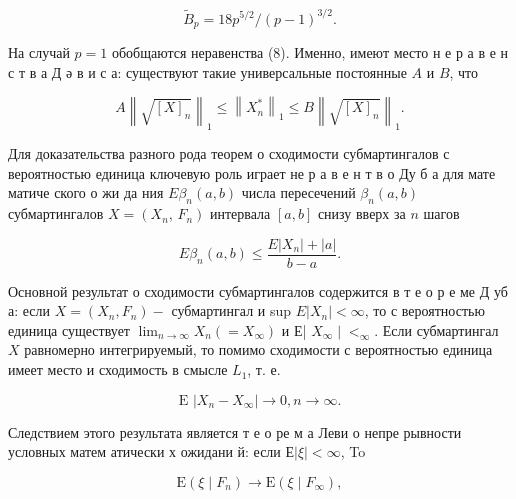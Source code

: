 \documentclass[10pt]{article}
\begin{document}
\[

\tilde{B}_{p}=18 p^{5 / 2} /(p-1)^{3 / 2} .

\]



На случай $p=1$ обобщаются неравенства (8). Именно, имеют место н е р а в е н с т в а Д ә в и с а: существуют такие универсальные постоянные $A$ и $B$, что



\[

A\left\|\sqrt{[X]_{n}}\right\|_{1} \leqslant\left\|X_{n}^{*}\right\|_{1} \leqslant B\left\|\sqrt{[X]_{n}}\right\|_{1} .

\]



Для доказательства разного рода теорем о сходимости субмартингалов с вероятностью единица ключевую роль играет не р а в е н т в о Ду б а для мате матиче ского о жи да ния $E \beta_{n}(a, b)$ числа пересечений $\beta_{n}(a, b)$ субмартингалов $X=\left(X_{n}\right.$, $\left.F_{n}\right)$ интервала $[a, b]$ снизу вверх за $n$ шагов



\[

E \beta_{n}(a, b) \leqslant \frac{E\left|X_{n}\right|+|a|}{b-a} .

\]



Основной результат о сходимости субмартингалов содержится в т е о р е ме Д уб а: если $X=\left(X_{n}, F_{n}\right)-$ субмартингал и sup $E\left|X_{n}\right|<\infty$, то с вероятностью единица существует $\lim _{n \rightarrow \infty} X_{n}\left(=X_{\infty}\right)$ и Е| $X_{\infty} \mid<_{\infty}$. Если субмартингал $X$ равномерно интегрируемый, то помимо сходимости с вероятностью единица имеет место и сходимость в смысле $L_{1}$, т. е.



\[

\text { E }\left|X_{n}-X_{\infty}\right| \longrightarrow 0, n \longrightarrow \infty \text {. }

\]



Следствием этого результата является т е о ре м а Леви о непре рывности условных матем атически х ожидани й: если $Е|\xi|<\infty$, To



\[

\mathrm{E}\left(\xi \mid F_{n}\right) \longrightarrow \mathrm{E}\left(\xi \mid F_{\infty}\right),

\]
\end{document}

